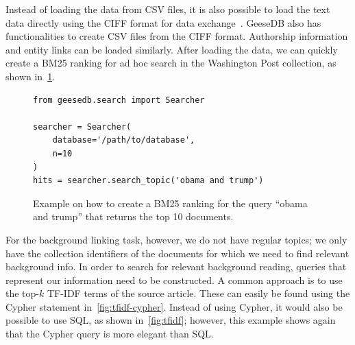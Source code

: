 Instead of loading the data from CSV files, it is also possible to load the text data directly using the CIFF format for data exchange~\citep{ciff}. GeeseDB also has functionalities to create CSV files from the CIFF format. Authorship information and entity links can be loaded similarly. After loading the data, we can quickly create a BM25 ranking for ad hoc search in the Washington Post collection, as shown in~\cref{fig:code_bm25_ranking}.

\begin{figure}
	\begin{verbatim}
from geesedb.search import Searcher

searcher = Searcher(
    database='/path/to/database', 
    n=10
)
hits = searcher.search_topic('obama and trump')
	\end{verbatim}
	\caption{Example on how to create a BM25 ranking for the query ``obama and trump'' that returns the top 10 documents.}
	\label{fig:code_bm25_ranking}
\end{figure}

For the background linking task, however, we do not have regular topics; we only have the collection identifiers of the documents for which we need to find relevant background info. In order to search for relevant background reading, queries that represent our information need to be constructed. A common approach is to use the top-$k$ TF-IDF terms of the source article. These can easily be found using the Cypher statement in~\cref{fig:tfidf-cypher}. Instead of using Cypher, it would also be possible to use SQL, as shown in~\cref{fig:tfidf}; however, this example shows again that the Cypher query is more elegant than SQL. 

